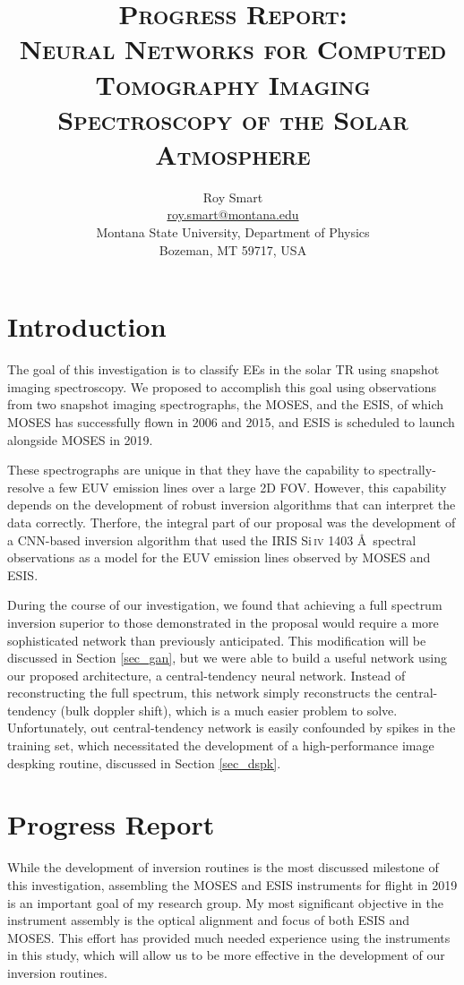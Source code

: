 \documentclass[10pt,letterpaper]{article}
\title{\textsc{Progress Report: \\ Neural Networks for Computed Tomography Imaging Spectroscopy of the Solar Atmosphere}}
\author{Roy Smart \\ \url{roy.smart@montana.edu} \\ Montana State University, Department of Physics \\ Bozeman, MT 59717, USA}
\begin{document}
	
	\maketitle
	
	\section{Introduction}
	
		The goal of this investigation is to classify \acp{EE} in the solar \ac{TR} using snapshot imaging spectroscopy. 
		We proposed to accomplish this goal using observations from two snapshot imaging spectrographs, the \ac{MOSES}, and the \ac{ESIS}, of which \ac{MOSES} has successfully flown in 2006 and 2015, and \ac{ESIS} is scheduled to launch alongside \ac{MOSES} in 2019.
		
		These spectrographs are unique in that they have the capability to spectrally-resolve a few \ac{EUV} emission lines over a large 2D \ac{FOV}.
		However, this capability depends on the development of robust inversion algorithms that can interpret the data correctly.
		Therfore, the integral part of our proposal was the development of a \ac{CNN}-based inversion algorithm that used the IRIS Si\,\textsc{iv} 1403 \AA\ spectral observations as a model for the \ac{EUV} emission lines observed by MOSES and ESIS.
		
		During the course of our investigation, we found that achieving a full spectrum inversion superior to those demonstrated in the proposal would require a more sophisticated network than previously anticipated.
		This modification will be discussed in Section \ref{sec_gan}, but we were able to build a useful network using our proposed architecture, a central-tendency neural network.
		Instead of reconstructing the full spectrum, this network simply reconstructs the central-tendency (bulk doppler shift), which is a much easier problem to solve.
		Unfortunately, out central-tendency network is easily confounded by spikes in the training set, which necessitated the development of a high-performance image despking routine, discussed in Section \ref{sec_dspk}.
		
	
	\section{Progress Report}
	
		While the development of inversion routines is the most discussed milestone of this investigation, assembling the MOSES and ESIS instruments for flight in 2019 is an important goal of my research group.
		My most significant objective in the instrument assembly is the optical alignment and focus of both ESIS and MOSES. 
		This effort has provided much needed experience using the instruments in this study, which will allow us to be more effective in the development of our inversion routines.
		
\end{document}
